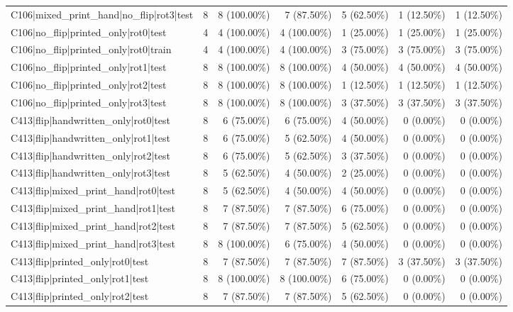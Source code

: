 \begin{longtable}{>{\raggedright\arraybackslash}p{5cm}rrrrrr}
C106|mixed\_print\_hand|no\_flip|rot3|test & 8 & 8 (100.00\%) & 7 (87.50\%) & 5 (62.50\%) & 1 (12.50\%) & 1 (12.50\%) \\
C106|no\_flip|printed\_only|rot0|test & 4 & 4 (100.00\%) & 4 (100.00\%) & 1 (25.00\%) & 1 (25.00\%) & 1 (25.00\%) \\
C106|no\_flip|printed\_only|rot0|train & 4 & 4 (100.00\%) & 4 (100.00\%) & 3 (75.00\%) & 3 (75.00\%) & 3 (75.00\%) \\
C106|no\_flip|printed\_only|rot1|test & 8 & 8 (100.00\%) & 8 (100.00\%) & 4 (50.00\%) & 4 (50.00\%) & 4 (50.00\%) \\
C106|no\_flip|printed\_only|rot2|test & 8 & 8 (100.00\%) & 8 (100.00\%) & 1 (12.50\%) & 1 (12.50\%) & 1 (12.50\%) \\
C106|no\_flip|printed\_only|rot3|test & 8 & 8 (100.00\%) & 8 (100.00\%) & 3 (37.50\%) & 3 (37.50\%) & 3 (37.50\%) \\
C413|flip|handwritten\_only|rot0|test & 8 & 6 (75.00\%) & 6 (75.00\%) & 4 (50.00\%) & 0 (0.00\%) & 0 (0.00\%) \\
C413|flip|handwritten\_only|rot1|test & 8 & 6 (75.00\%) & 5 (62.50\%) & 4 (50.00\%) & 0 (0.00\%) & 0 (0.00\%) \\
C413|flip|handwritten\_only|rot2|test & 8 & 6 (75.00\%) & 5 (62.50\%) & 3 (37.50\%) & 0 (0.00\%) & 0 (0.00\%) \\
C413|flip|handwritten\_only|rot3|test & 8 & 5 (62.50\%) & 4 (50.00\%) & 2 (25.00\%) & 0 (0.00\%) & 0 (0.00\%) \\
C413|flip|mixed\_print\_hand|rot0|test & 8 & 5 (62.50\%) & 4 (50.00\%) & 4 (50.00\%) & 0 (0.00\%) & 0 (0.00\%) \\
C413|flip|mixed\_print\_hand|rot1|test & 8 & 7 (87.50\%) & 7 (87.50\%) & 6 (75.00\%) & 0 (0.00\%) & 0 (0.00\%) \\
C413|flip|mixed\_print\_hand|rot2|test & 8 & 7 (87.50\%) & 7 (87.50\%) & 5 (62.50\%) & 0 (0.00\%) & 0 (0.00\%) \\
C413|flip|mixed\_print\_hand|rot3|test & 8 & 8 (100.00\%) & 6 (75.00\%) & 4 (50.00\%) & 0 (0.00\%) & 0 (0.00\%) \\
C413|flip|printed\_only|rot0|test & 8 & 7 (87.50\%) & 7 (87.50\%) & 7 (87.50\%) & 3 (37.50\%) & 3 (37.50\%) \\
C413|flip|printed\_only|rot1|test & 8 & 8 (100.00\%) & 8 (100.00\%) & 6 (75.00\%) & 0 (0.00\%) & 0 (0.00\%) \\
C413|flip|printed\_only|rot2|test & 8 & 7 (87.50\%) & 7 (87.50\%) & 5 (62.50\%) & 0 (0.00\%) & 0 (0.00\%) \\

\end{longtable}
